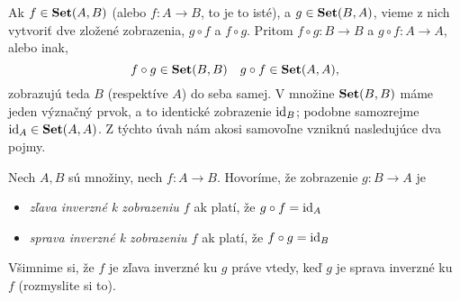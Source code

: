 Ak $f\in\mathbf{Set}(A,B)$ (alebo $f\colon A\to B$, to je to isté), a $g\in\mathbf{Set}(B,A)$,
vieme z nich vytvoriť dve zložené zobrazenia, $g\circ f$ a $f\circ g$. Pritom
$f\circ g\colon B\to B$ a $g\circ f\colon A\to A$, alebo inak,
\[
f\circ g\in\mathbf{Set}(B,B)\quad g\circ f\in\mathbf{Set}(A,A),
\]
zobrazujú teda $B$ (respektíve $A$) do seba samej.
V množine $\mathbf{Set}(B,B)$ máme jeden význačný prvok, a to identické zobrazenie
$\mathrm{id}_B$; podobne samozrejme $\mathrm{id}_A\in\mathbf{Set}(A,A)$. Z týchto úvah nám akosi samovoľne vzniknú nasledujúce dva pojmy.
\begin{definition}\label{def:zlavaSpravaInverzne}
Nech $A,B$ sú množiny, nech $f\colon A\to B$. Hovoríme, že zobrazenie $g\colon B\to A$ je
\begin{itemize}
\item \emph{zľava inverzné k zobrazeniu $f$} ak platí, že $g\circ f=\mathrm{id}_A$
\item \emph{sprava inverzné k zobrazeniu $f$} ak platí, že $f\circ g=\mathrm{id}_B$
\end{itemize}
\end{definition}

Všimnime si, že $f$ je zľava inverzné ku $g$ práve vtedy, keď $g$ je sprava inverzné
ku $f$ (rozmyslite si to).

